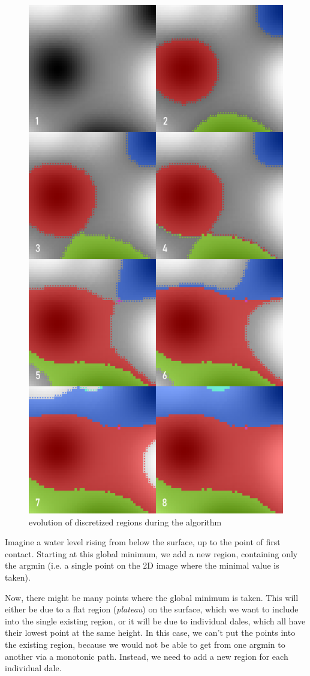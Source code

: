 \documentclass[11pt,twoside,twocolumn,a4paper]{article}
\theoremstyle{plain}
\theoremstyle{definition}
\begin{document}
\begin{figure}
\centering
\includegraphics[width=0.70\columnwidth]{img/slope_evolution.png}
\caption{evolution of discretized regions during the algorithm}
\label{fig:evolution}
\end{figure}

Imagine a water level rising from below the surface, up to the point of first contact.
Starting at this global minimum, we add a new region, containing only the argmin (i.e. a single point on the 2D image where the minimal value is taken).

Now, there might be many points where the global minimum is taken.
This will either be due to a flat region (\emph{plateau}) on the surface, which we want to include into the single existing region, or it will be due to individual dales, which all have their lowest point at the same height.
In this case, we can't put the points into the existing region, because we would not be able to get from one argmin to another via a monotonic path.
Instead, we need to add a new region for each individual dale.
\end{document}
